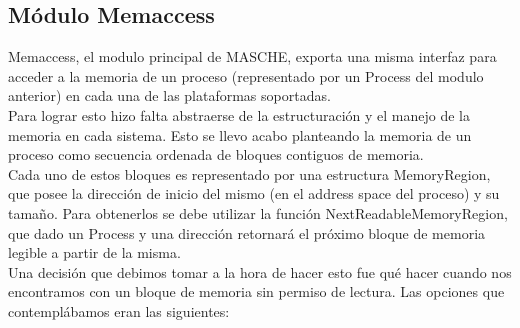 \subsection{Módulo Memaccess}

Memaccess, el modulo principal de MASCHE, exporta una misma interfaz para
acceder a la memoria de un proceso (representado por un Process del modulo
anterior) en cada una de las plataformas soportadas.\\

Para lograr esto hizo falta abstraerse de la estructuración y el manejo de la
memoria en cada sistema. Esto se llevo acabo planteando la memoria de un proceso
como secuencia ordenada de bloques contiguos de memoria.\\

Cada uno de estos bloques es representado por una estructura MemoryRegion, que
posee la dirección de inicio del mismo (en el address space del proceso) y su
tamaño. Para obtenerlos se debe utilizar la función NextReadableMemoryRegion,
que dado un Process y una dirección retornará el próximo bloque de memoria
legible a partir de la misma.\\

Una decisión que debimos tomar a la hora de hacer esto fue qué hacer cuando nos
encontramos con un bloque de memoria sin permiso de lectura. Las opciones que
contemplábamos eran las siguientes:

